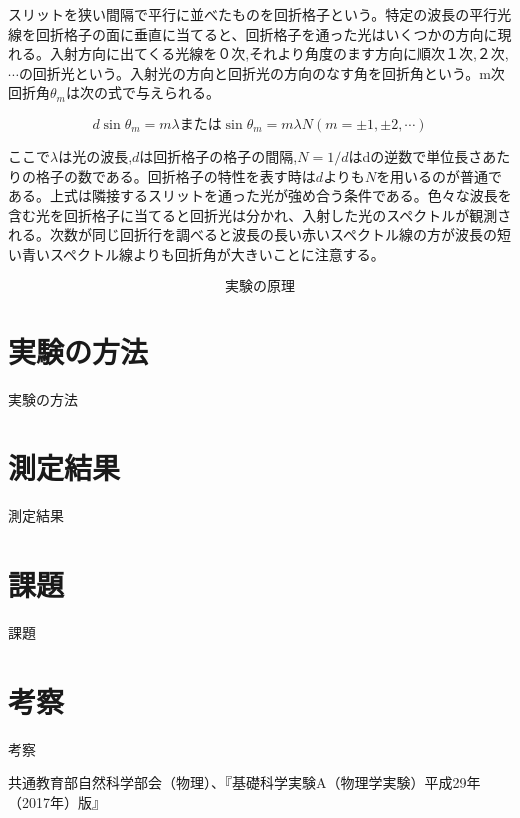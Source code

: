 \documentclass{jsarticle}
\begin{document}
スリットを狭い間隔で平行に並べたものを回折格子という。特定の波長の平行光線を回折格子の面に垂直に当てると、回折格子を通った光はいくつかの方向に現れる。入射方向に出てくる光線を０次,それより角度のます方向に順次１次,２次,$\cdots$の回折光という。入射光の方向と回折光の方向のなす角を回折角という。m次回折角$\theta_m$は次の式で与えられる。

\begin{equation}
    d\sin{\theta_m} = m\lambda または \sin{\theta_m} = m\lambda N (m = \pm 1,\pm 2, \cdots)
\end{equation}

ここで$\lambda$は光の波長,$d$は回折格子の格子の間隔,$N = 1/d$はdの逆数で単位長さあたりの格子の数である。回折格子の特性を表す時は$d$よりも$N$を用いるのが普通である。上式は隣接するスリットを通った光が強め合う条件である。色々な波長を含む光を回折格子に当てると回折光は分かれ、入射した光のスペクトルが観測される。次数が同じ回折行を調べると波長の長い赤いスペクトル線の方が波長の短い青いスペクトル線よりも回折角が大きいことに注意する。

\begin{equation}
    実験の原理
\end{equation}


\section{実験の方法}

実験の方法

\section{測定結果}

測定結果

\section{課題}

課題

\section{考察}

考察






\begin{thebibliography}{99}
     共通教育部自然科学部会（物理）、『基礎科学実験A（物理学実験）平成29年（2017年）版』
\end{thebibliography}
\end{document}
